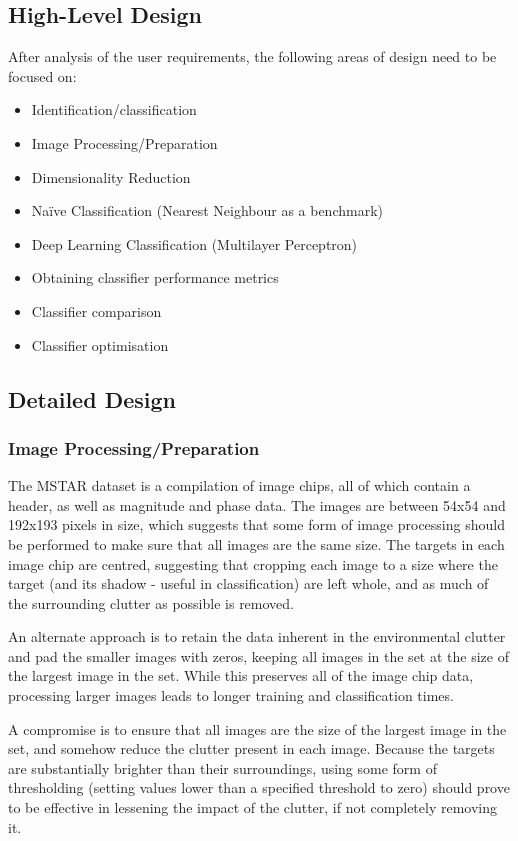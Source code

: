 \subsection{High-Level Design}
After analysis of the user requirements, the following areas of design need to be focused on:

\begin{itemize}
	\item Identification/classification
	\item Image Processing/Preparation
	\item Dimensionality Reduction
	\item Na{\"i}ve Classification (Nearest Neighbour as a benchmark)
	\item Deep Learning Classification (Multilayer Perceptron)
	\item Obtaining classifier performance metrics
	\item Classifier comparison
	\item Classifier optimisation
\end{itemize}



\subsection{Detailed Design}
\subsubsection{Image Processing/Preparation}\label{sec:cropping}
The MSTAR dataset is a compilation of image chips, all of which contain a header, as well as magnitude and phase data. The images are between 54x54 and 192x193 pixels in size, which suggests that some form of image processing should be performed to make sure that all images are the same size. The targets in each image chip are centred, suggesting that cropping each image to a size where the target (and its shadow - useful in classification) are left whole, and as much of the surrounding clutter as possible is removed.

An alternate approach is to retain the data inherent in the environmental clutter and pad the smaller images with zeros, keeping all images in the set at the size of the largest image in the set. While this preserves all of the image chip data, processing larger images leads to longer training and classification times.

A compromise is to ensure that all images are the size of the largest image in the set, and somehow reduce the clutter present in each image. Because the targets are substantially brighter than their surroundings, using some form of thresholding (setting values lower than a specified threshold to zero) should prove to be effective in lessening the impact of the clutter, if not completely removing it.

